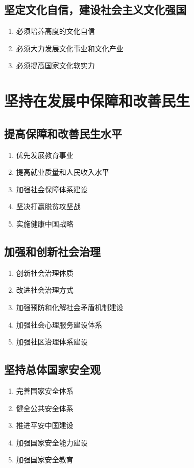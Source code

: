    \subsection{坚定文化自信，建设社会主义文化强国}
        \begin{enumerate}
            \item 必须培养高度的文化自信
            \item 必须大力发展文化事业和文化产业
            \item 必须提高国家文化软实力
        \end{enumerate}


\section{坚持在发展中保障和改善民生}
    \subsection{提高保障和改善民生水平}
        \begin{enumerate}
            \item 优先发展教育事业
            \item 提高就业质量和人民收入水平
            \item 加强社会保障体系建设
            \item 坚决打赢脱贫攻坚战
            \item 实施健康中国战略
        \end{enumerate}

    \subsection{加强和创新社会治理}
        \begin{enumerate}
            \item 创新社会治理体质
            \item 改进社会治理方式
            \item 加强预防和化解社会矛盾机制建设
            \item 加强社会心理服务建设体系
            \item 加强社区治理体系建设
        \end{enumerate}

    \subsection{坚持总体国家安全观}
        \begin{enumerate}
            \item 完善国家安全体系
            \item 健全公共安全体系
            \item 推进平安中国建设
            \item 加强国家安全能力建设
            \item 加强国家安全教育
        \end{enumerate}


